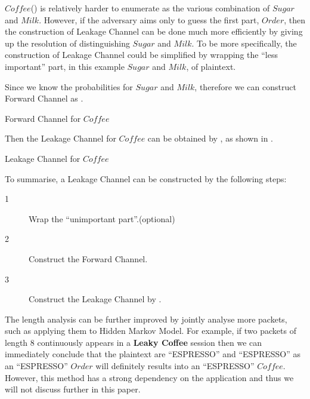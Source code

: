 \begin{example} \label{Ex: Single-OrderFlavour}
$Coffee$() is relatively harder to enumerate as the various combination of $Sugar$ and $Milk$. However, if the adversary aims only to guess the first part, $Order$, then the construction of Leakage Channel can be done much more efficiently by giving up the resolution of distinguishing $Sugar$ and $Milk$. To be more specifically, the construction of Leakage Channel could be simplified by wrapping the “less important” part, in this example $Sugar$ and $Milk$, of plaintext.

Since we know the probabilities for $Sugar$ and $Milk$, therefore we can construct Forward Channel as .

\begin{table}[H]
\centering
\resizebox{\textwidth}{!}{
{}
}
\caption{Forward Channel for $Coffee$}
\label{Tbl: Forward Channel for Coffee}
\end{table}

Then the Leakage Channel for $Coffee$ can be obtained by , as shown in .
\begin{table}[H]
\centering
{}
\caption{Leakage Channel for $Coffee$}
\label{Tbl: Leakage Channel for Coffee}
\end{table}
\end{example}

To summarise, a Leakage Channel can be constructed by the following steps:
\begin{description}
\item[1] Wrap the “unimportant part”.(optional)
\item[2] Construct the Forward Channel.
\item[3] Construct the Leakage Channel by .
\end{description}

The length analysis can be further improved by jointly analyse more packets, such as applying them to Hidden Markov Model. For example, if two packets of length $8$ continuously appears in a \textbf{Leaky Coffee} session then we can immediately conclude that the plaintext are “ESPRESSO” and “ESPRESSO” as an “ESPRESSO” $Order$ will definitely results into an “ESPRESSO” $Coffee$. However, this method has a strong dependency on the application and thus we will not discuss further in this paper.


